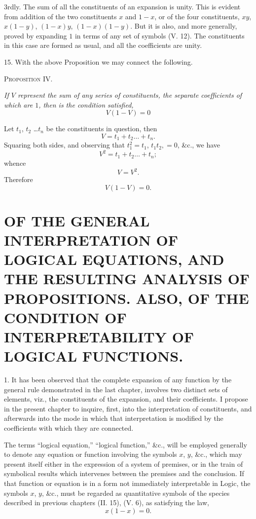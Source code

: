\documentclass[oneside]{book}
\begin{document}
3rdly. The sum of all the constituents of an expansion is
unity. This is evident from addition of the two constituents $x$
and $1 - x$, or of the four constituents, $xy$, $x(1-y)$, $(1-x)y$,
$(1-x)(1-y)$. But it is also, and more generally, proved by
expanding $1$ in terms of any set of symbols (V. 12). The constituents
in this case are formed as usual, and all the coefficients
are unity.

15. With the above Proposition we may connect the following.

\begin{center}
\textsc{Proposition IV.}
\end{center}

\textit{If $V$ represent the sum of any series of constituents, the separate
coefficients of which are $1$, then is the condition satisfied,
\[
V\left(1-V\right) = 0
\]}

Let $t_1$, $t_2$ \dots $t_n$ be the constituents in question, then
\[
V=t_1 + t_2 \dots + t_n.
\]
Squaring both sides, and observing that $t_1^2 = t_1$, $t_1 t_2, = 0$, \&c., we
have
\[
V^2 = t_1 + t_2 \dots + t_n;
\]
whence
\[
V = V^2.
\]
Therefore
\[
V\left(1-V\right) = 0.
\]

\chapter[OF INTERPRETATION]
{\large OF THE GENERAL INTERPRETATION OF LOGICAL EQUATIONS, AND
THE RESULTING ANALYSIS OF PROPOSITIONS. ALSO, OF THE
CONDITION OF INTERPRETABILITY OF LOGICAL FUNCTIONS.}

1. It has been observed that the complete expansion of any
function by the general rule demonstrated in the last
chapter, involves two distinct sets of elements, viz., the constituents
of the expansion, and their coefficients. I propose in
the present chapter to inquire, first, into the interpretation of
constituents, and afterwards into the mode in which that interpretation
is modified by the coefficients with which they are
connected.

The terms ``logical equation,'' ``logical function,'' \&c., will
be employed generally to denote any equation or function involving
the symbols $x$, $y$, \&c., which may present itself either
in the expression of a system of premises, or in the train of symbolical
results which intervenes between the premises and the
conclusion. If that function or equation is in a form not immediately
interpretable in Logic, the symbols $x$, $y$, \&c., must be regarded
as quantitative symbols of the species described in previous
chapters (II. 15), (V. 6), as satisfying the law,
\[
x\left(1-x\right) = 0.
\]
\end{document}
